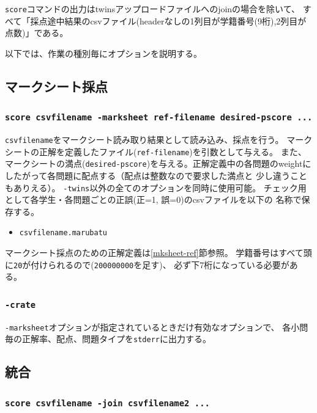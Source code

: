 \texttt{score}コマンドの出力はtwinsアップロードファイルへのjoinの場合を除いて、
すべて「採点途中結果のcsvファイル(headerなしの1列目が学籍番号(9桁),2列目が点数)」である。

以下では、作業の種別毎にオプションを説明する。

\subsection{マークシート採点}
\label{マークシート採点}

\subsubsection{\texttt{score csvfilename -marksheet ref-filename desired-pscore ...}}
\label{scorecsvfilename-marksheetref-filenamedesired-pscore...}

\texttt{csvfilename}をマークシート読み取り結果として読み込み、採点を行う。
マークシートの正解を定義したファイル(\texttt{ref-filename})を引数として与える。
また、マークシートの満点(\texttt{desired-pscore})を与える。正解定義中の各問題のweightに
したがって各問題に配点する（配点は整数なので要求した満点と
少し違うこともありえる）。
\texttt{-twins}以外の全てのオプションを同時に使用可能。
チェック用として各学生・各問題ごとの正誤(正=1, 誤=0)のcsvファイルを以下の
名称で保存する。

\begin{itemize}
\item \texttt{csvfilename.marubatu}

\end{itemize}

マークシート採点のための正解定義は\ref{mksheet-ref}節参照。
学籍番号はすべて頭に\texttt{20}が付けられるので(\texttt{200000000}を足す)、
必ず下7桁になっている必要がある。

\subsubsection{\texttt{-crate}}
\label{-crate}

\texttt{-marksheet}オプションが指定されているときだけ有効なオプションで、
各小問毎の正解率、配点、問題タイプを\texttt{stderr}に出力する。

\subsection{統合}
\label{統合}

\subsubsection{\texttt{score csvfilename -join csvfilename2 ...}}
\label{scorecsvfilename-joincsvfilename2...}

